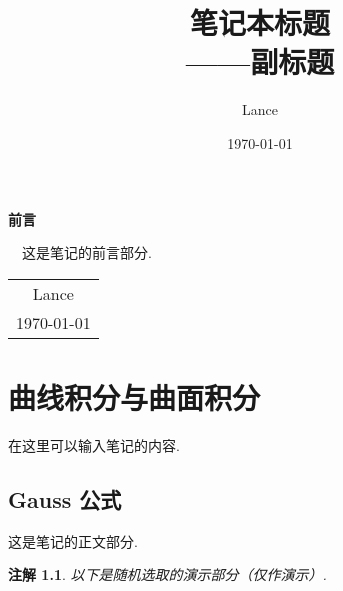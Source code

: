 \documentclass[12pt, a4paper, oneside]{ctexbook}
\title{{\Huge{\textbf{笔记本标题}}}\\——副标题}
\author{Lance}
\date{\today}
\newtheorem{remark}{注解}
\begin{document}
    \maketitle

    \setcounter{page}{1}    %

    \begin{center}
        \Huge\textbf{前言}
    \end{center}~\
    这是笔记的前言部分. 
    ~\\
    \begin{flushright}
        \begin{tabular}{c}
            Lance\\
            \today
        \end{tabular}
    \end{flushright}

    \newpage
    \setcounter{page}{1}

    \tableofcontents

    \newpage
    \setcounter{page}{1}


    \chapter{曲线积分与曲面积分}

    在这里可以输入笔记的内容. 

        \section{Gauss 公式}

        这是笔记的正文部分.

        \begin{remark}
            以下是随机选取的演示部分（仅作演示）.
        \end{remark}
\end{document}
